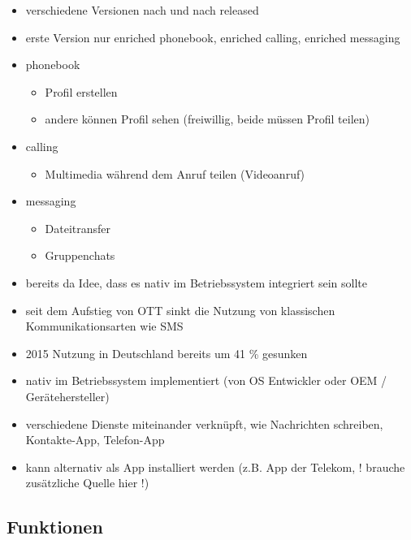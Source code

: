 \documentclass[conference]{IEEEtran}
\begin{document}
\begin{itemize}
    \item verschiedene Versionen nach und nach released
    \item erste Version nur enriched phonebook, enriched calling, enriched messaging
    \item phonebook
          \begin{itemize}
              \item Profil erstellen
              \item andere können Profil sehen (freiwillig, beide müssen Profil teilen)
          \end{itemize}
    \item calling
          \begin{itemize}
              \item Multimedia während dem Anruf teilen (Videoanruf)
          \end{itemize}
    \item messaging
          \begin{itemize}
              \item Dateitransfer
              \item Gruppenchats
          \end{itemize}
    \item bereits da Idee, dass es nativ im Betriebssystem integriert sein sollte
\end{itemize}
\cite{rcsuite}

\begin{itemize}
    \item seit dem Aufstieg von OTT sinkt die Nutzung von klassischen Kommunikationsarten wie SMS
    \item 2015 Nutzung in Deutschland bereits um 41 \% gesunken
\end{itemize}
\cite{ottmobinter}

\begin{itemize}
    \item nativ im Betriebssystem implementiert (von OS Entwickler oder OEM / Gerätehersteller)
    \item verschiedene Dienste miteinander verknüpft, wie Nachrichten schreiben, Kontakte-App, Telefon-App
    \item kann alternativ als App installiert werden (z.B. App der Telekom, ! brauche zusätzliche Quelle hier !)
\end{itemize}
\cite{uniprof}

\subsection{Funktionen}
\end{document}
